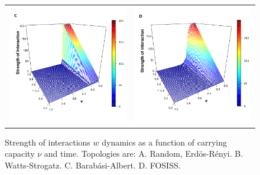 \documentclass[11pt]{article}
\begin{document}
\begin{figure} [h!]
\begin{tabular}{cc}
\includegraphics[scale=0.28]{images/barabasi_trust_nus_1.png} & \includegraphics[scale=0.28]{images/fosiss_trust_nus_1.png}
\end{tabular}
\caption{Strength of interactions $w$ dynamics as a function of carrying capacity $\nu$ and time. Topologies are: A. Random, Erd\"{o}s-R\'enyi. B. Watts-Strogatz. C. Barab\'asi-Albert. D. FOSISS.}\label{trust}
\end{figure}
\end{document}
